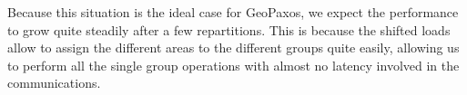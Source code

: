 Because this situation is the ideal case for GeoPaxos, we expect the performance to grow quite steadily after a few repartitions. This is because the shifted loads allow to assign the different areas to the different groups quite easily, allowing us to perform all the single group operations with almost no latency involved in the communications.





